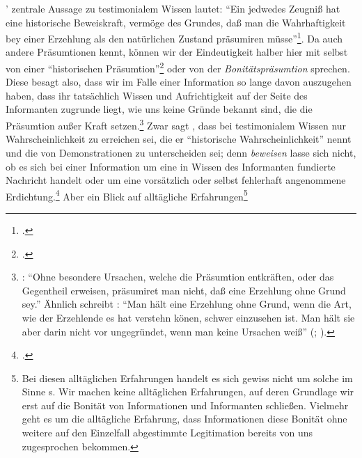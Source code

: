 ' zentrale Aussage zu
testimonialem Wissen lautet: \enquote{Ein jedwedes Zeugniß hat eine historische
Beweiskraft, vermöge des Grundes, daß man die Wahrhaftigkeit bey einer Erzehlung
als den natürlichen Zustand präsumiren
müsse}\footnote{\Cite[][\S~617]{Crusius:WegzurGewissheitundZuverlaessigkeitdermenschlichenErkenntniss1965}.}.
Da  auch andere Präsumtionen
kennt, können wir der Eindeutigkeit halber hier mit
 selbst von einer
\enquote{historischen Präsumtion}\footnote{\Cite[][\S~617]{Crusius:WegzurGewissheitundZuverlaessigkeitdermenschlichenErkenntniss1965}.}
oder von der \emph{Bonitätspräsumtion} sprechen.
Diese besagt also, dass wir im Falle einer Information so lange davon auszugehen
haben, dass ihr tatsächlich Wissen und Aufrichtigkeit auf der Seite des
Informanten zugrunde liegt, wie uns keine Gründe bekannt sind, die die Präsumtion außer Kraft
setzen.\footnote{\cite[Vgl.][\S~606]{Crusius:WegzurGewissheitundZuverlaessigkeitdermenschlichenErkenntniss1965}:
\enquote{Ohne besondere Ursachen, welche die Präsumtion entkräften, oder das
Gegen\-theil erweisen, präsumiret man nicht, daß eine Erzehlung ohne Grund
sey.} Ähnlich schreibt : \enquote{Man hält eine Erzehlung
ohne Grund, wenn die Art, wie der Erzehlende es hat verstehn könen, schwer
einzusehen ist. Man hält sie aber darin nicht vor ungegründet, wenn man keine
Ursachen weiß} \mkbibparens{\cite[][]{Kant:Reflexionen1900ff.};
\cite[][XVI: 430.7--10]{Kant:GesammelteWerke1900ff.}}.} Zwar sagt
, dass bei testimonialem Wissen nur Wahrscheinlichkeit zu erreichen sei, die er \enquote{historische Wahrscheinlichkeit} nennt und die von
Demonstrationen zu unterscheiden sei; denn \emph{beweisen} lasse sich nicht, ob
es sich bei einer Information um eine in Wissen des Informanten fundierte
Nachricht handelt oder um eine vorsätzlich oder selbst fehlerhaft angenommene
Erdichtung.\footnote{\cite[Vgl.][\S~605]{Crusius:WegzurGewissheitundZuverlaessigkeitdermenschlichenErkenntniss1965}.}
Aber ein Blick auf alltägliche Erfahrungen\footnote{Bei diesen alltäglichen
Erfahrungen handelt es sich gewiss nicht um solche im Sinne s. Wir
machen keine alltäglichen Erfahrungen, auf deren Grundlage wir erst auf die
Bonität von Informationen und Informanten schließen. Vielmehr geht es um die
alltägliche Erfahrung, dass Informationen diese Bonität ohne weitere auf den
Einzelfall abgestimmte Legitimation bereits von uns zugesprochen bekommen.}
